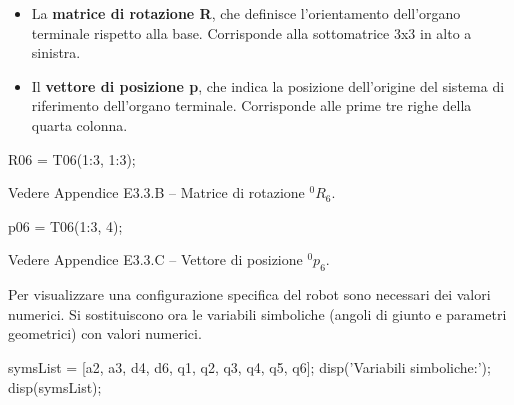 \documentclass[11pt, a4paper]{article}
\begin{document}
\begin{itemize}
\setlength{\itemsep}{-1ex}
   \item{\begin{flushleft} La \textbf{matrice di rotazione R}, che definisce l'orientamento dell'organo terminale rispetto alla base. Corrisponde alla sottomatrice 3x3 in alto a sinistra. \end{flushleft}}
   \item{\begin{flushleft} Il \textbf{vettore di posizione p}, che indica la posizione dell'origine del sistema di riferimento dell'organo terminale. Corrisponde alle prime tre righe della quarta colonna. \end{flushleft}}
\end{itemize}

\begin{matlabcode}
R06 = T06(1:3, 1:3);
\end{matlabcode}

\begin{par}
\begin{flushleft}
Vedere Appendice E3.3.B -- Matrice di rotazione ${}^{0}R_{6}$.
\end{flushleft}
\end{par}

\begin{matlabcode}
p06 = T06(1:3, 4);
\end{matlabcode}

\begin{par}
\begin{flushleft}
Vedere Appendice E3.3.C -- Vettore di posizione ${}^{0}p_{6}$.
\end{flushleft}
\end{par}

\begin{par}
\begin{flushleft}
Per visualizzare una configurazione specifica del robot sono necessari dei valori numerici. Si sostituiscono ora le variabili simboliche (angoli di giunto e parametri geometrici) con valori numerici.
\end{flushleft}
\end{par}

\begin{matlabcode}
symsList = [a2, a3, d4, d6, q1, q2, q3, q4, q5, q6];
disp('Variabili simboliche:');
disp(symsList);
\end{matlabcode}
\end{document}
